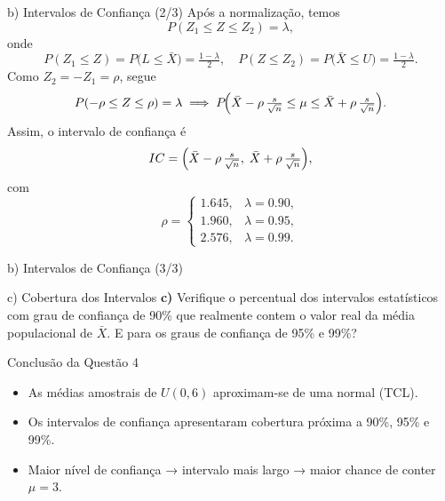\begin{frame}{b) Intervalos de Confiança (2/3)}
Após a normalização, temos
\[
P(Z_1 \le Z \le Z_2) = \lambda,
\]
onde
\[
P(Z_1 \le Z)=P\bigl(L \le \bar X\bigr)=\tfrac{1-\lambda}{2},
\quad
P(Z \le Z_2)=P\bigl(\bar X \le U\bigr)=\tfrac{1-\lambda}{2}.
\]
Como $Z_2=-Z_1=\rho$, segue
\[
P(-\rho \le Z \le \rho)=\lambda
\;\Longrightarrow\;
P\!\Bigl(\bar X - \rho\,\tfrac{s}{\sqrt n} \le \mu \le \bar X + \rho\,\tfrac{s}{\sqrt n}\Bigr).
\]
Assim, o intervalo de confiança é
\[
IC = \Bigl(\bar X - \rho\,\tfrac{s}{\sqrt n},\;\bar X + \rho\,\tfrac{s}{\sqrt n}\Bigr),
\]
com
\[
\rho =
\begin{cases}
1.645, & \lambda=0.90,\\
1.960, & \lambda=0.95,\\
2.576, & \lambda=0.99.
\end{cases}
\]
\end{frame}

\begin{frame}[fragile]{b) Intervalos de Confiança (3/3)}

\end{frame}

\begin{frame}[fragile]{c) Cobertura dos Intervalos}
\textbf{c)} Verifique o percentual dos intervalos estatísticos com grau de confiança de 90\% que realmente contem o valor real da média populacional de $\bar X$. E para os graus de confiança de 95\% e 99\%?

\vspace{0.5em}

\end{frame}

\begin{frame}{Conclusão da Questão 4}
\begin{itemize}
  \item As médias amostrais de $U(0,6)$ aproximam-se de uma normal (TCL).
  \item Os intervalos de confiança apresentaram cobertura próxima a 90\%, 95\% e 99\%.
  \item Maior nível de confiança → intervalo mais largo → maior chance de conter $\mu=3$.
\end{itemize}
\end{frame}
